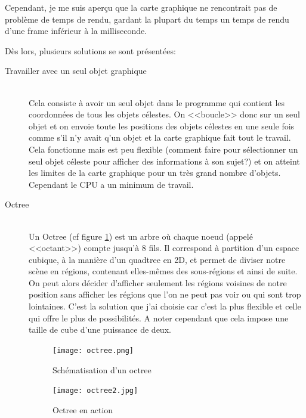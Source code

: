 \documentclass[a4paper,french,12pt]{article}
\begin{document}
		  Cependant, je me suis aperçu que la carte graphique ne rencontrait pas de problème de temps de rendu,
		  gardant la plupart du temps un temps de rendu d'une frame inférieur à la milliseconde.
		  
		  Dès lors, plusieurs solutions se sont présentées:
		  
		  \begin{description}
		  \item [Travailler avec un seul objet graphique]~\\ Cela consiste à avoir un seul objet dans le programme qui 
		  contient les coordonnées de tous les objets célestes. On <<boucle>> donc sur un seul objet et on envoie toute
		  les positions des objets célestes en une seule fois comme s'il n'y avait q'un objet et la carte
		  graphique fait tout le travail. Cela fonctionne mais est peu flexible (comment faire pour sélectionner
		  un seul objet céleste pour afficher des informations à son sujet?) et on atteint les limites de la
		  carte graphique pour un très grand nombre d'objets. Cependant le CPU a un minimum de travail.
		  
		  \item [Octree]~\\ Un Octree (cf figure \ref{octree_action}) est un arbre où chaque noeud (appelé <<octant>>) compte jusqu'à 8 fils. Il correspond à partition
		  d'un espace cubique, à la manière d'un quadtree en 2D, et permet de diviser notre scène en régions,
		  contenant elles-mêmes des sous-régions et ainsi de suite. On peut alors décider d'afficher seulement les
		  régions voisines de notre position sans afficher les régions que l'on ne peut pas voir ou qui sont
		  trop lointaines. C'est la solution que j'ai choisie car c'est la plus flexible et celle qui offre le
		  plus de possibilités. A noter cependant que cela impose une taille de cube d'une puissance de deux.
		  \FloatBarrier
		  \begin{figure}
			      \centering
				\texttt{[image: octree.png]}
			      \caption{Schématisation d'un octree}
			      
		   \end{figure} 
		    
		
			      
		\begin{figure} 
			\centering
				\texttt{[image: octree2.jpg]}
			      \caption{Octree en action}
			      \label{octree_action}
		  
		\end{figure}
		  \FloatBarrier
		\end{description}
\end{document}
